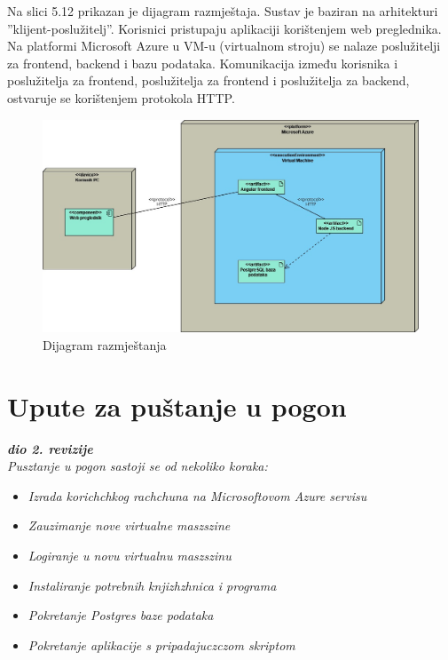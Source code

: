 			 Na slici 5.12 prikazan je dijagram razmještaja. Sustav je baziran na arhitekturi ”klijent-poslužitelj”. Korisnici pristupaju aplikaciji korištenjem web preglednika. Na platformi Microsoft Azure u VM-u (virtualnom stroju) se nalaze poslužitelji za frontend, backend i bazu podataka. Komunikacija između korisnika i poslužitelja za frontend, poslužitelja za frontend i poslužitelja za backend, ostvaruje se korištenjem protokola HTTP.
			 
			 
			 
			 \begin{figure}[H]
			            \includegraphics[width=\textwidth]{slike/dijagram razmjeÅ¡taja(1).vpd.jpg} %
			          \caption{Dijagram razmještanja}
			            \label{fig:dijagram_razmjestanja} %
		      \end{figure}
			
			\eject 
		
		\section{Upute za puštanje u pogon}
		
			\textbf{\textit{dio 2. revizije}}\\
		
			 \textit{Pusztanje u pogon sastoji se od nekoliko koraka:}
    \begin{itemize}
		\item 	\textit{Izrada korichchkog rachchuna na Microsoftovom Azure servisu}
		\item 	\textit{Zauzimanje nove virtualne maszszine}
		\item 	\textit{Logiranje u novu virtualnu maszszinu}
		\item 	\textit{Instaliranje potrebnih knjizhzhnica i programa}
		\item 	\textit{Pokretanje Postgres baze podataka}
		\item 	\textit{Pokretanje aplikacije s pripadajuczczom skriptom}
	\end{itemize}

